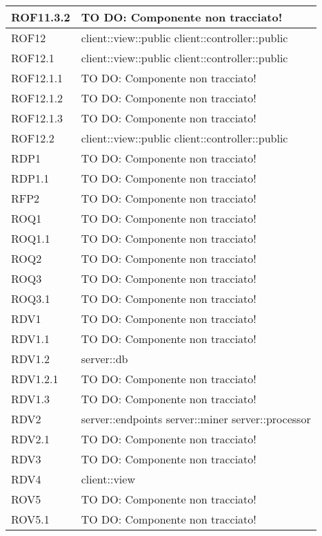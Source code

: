 \begin{center}
\begin{longtable}{| p{4cm} | p{8cm} |}
\hline
ROF11.3.2 & TO DO: Componente non tracciato! \\
\hline
ROF12 & client::view::public \newline client::controller::public \\
\hline
ROF12.1 & client::view::public \newline client::controller::public \\
\hline
ROF12.1.1 & TO DO: Componente non tracciato! \\
\hline
ROF12.1.2 & TO DO: Componente non tracciato! \\
\hline
ROF12.1.3 & TO DO: Componente non tracciato! \\
\hline
ROF12.2 & client::view::public \newline client::controller::public \\
\hline
RDP1 & TO DO: Componente non tracciato! \\
\hline
RDP1.1 & TO DO: Componente non tracciato! \\
\hline
RFP2 & TO DO: Componente non tracciato! \\
\hline
ROQ1 & TO DO: Componente non tracciato! \\
\hline
ROQ1.1 & TO DO: Componente non tracciato! \\
\hline
ROQ2 & TO DO: Componente non tracciato! \\
\hline
ROQ3 & TO DO: Componente non tracciato! \\
\hline
ROQ3.1 & TO DO: Componente non tracciato! \\
\hline
RDV1 & TO DO: Componente non tracciato! \\
\hline
RDV1.1 & TO DO: Componente non tracciato! \\
\hline
RDV1.2 & server::db \\
\hline
RDV1.2.1 & TO DO: Componente non tracciato! \\
\hline
RDV1.3 & TO DO: Componente non tracciato! \\
\hline
RDV2 & server::endpoints \newline server::miner \newline server::processor \\
\hline
RDV2.1 & TO DO: Componente non tracciato! \\
\hline
RDV3 & TO DO: Componente non tracciato! \\
\hline
RDV4 & client::view \\
\hline
ROV5 & TO DO: Componente non tracciato! \\
\hline
ROV5.1 & TO DO: Componente non tracciato! \\

\end{longtable}
\end{center}
